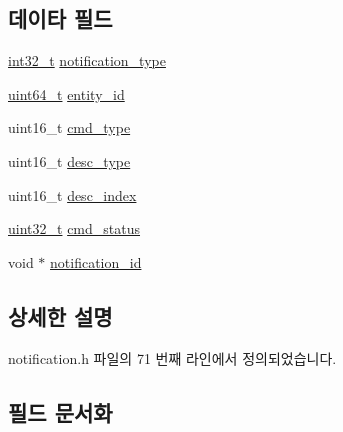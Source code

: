 \subsection*{데이타 필드}
\begin{DoxyCompactItemize}
\item 
\hyperlink{parse_8c_a37994e3b11c72957c6f454c6ec96d43d}{int32\+\_\+t} \hyperlink{structavdecc__lib_1_1notification_1_1notification__data_afd27fd1b2a0f1fb47cab9d187d542155}{notification\+\_\+type}
\item 
\hyperlink{parse_8c_aec6fcb673ff035718c238c8c9d544c47}{uint64\+\_\+t} \hyperlink{structavdecc__lib_1_1notification_1_1notification__data_af62ee4e75fffd2fbb80f324b5cbcddaa}{entity\+\_\+id}
\item 
uint16\+\_\+t \hyperlink{structavdecc__lib_1_1notification_1_1notification__data_a3bce0b5ba2f67f9b7e6af3cf5903bad2}{cmd\+\_\+type}
\item 
uint16\+\_\+t \hyperlink{structavdecc__lib_1_1notification_1_1notification__data_a9dada313309522d04f1e52fe887442b4}{desc\+\_\+type}
\item 
uint16\+\_\+t \hyperlink{structavdecc__lib_1_1notification_1_1notification__data_a2bbd0d8f32f687ca36aaa543c06f764c}{desc\+\_\+index}
\item 
\hyperlink{parse_8c_a6eb1e68cc391dd753bc8ce896dbb8315}{uint32\+\_\+t} \hyperlink{structavdecc__lib_1_1notification_1_1notification__data_a4ee5fdad0d413ea837e5ecfd71495848}{cmd\+\_\+status}
\item 
void $\ast$ \hyperlink{structavdecc__lib_1_1notification_1_1notification__data_a1efd7ce38af0ff90ffefd52133214023}{notification\+\_\+id}
\end{DoxyCompactItemize}


\subsection{상세한 설명}


notification.\+h 파일의 71 번째 라인에서 정의되었습니다.



\subsection{필드 문서화}
